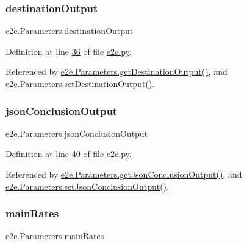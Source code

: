 \subsubsection{\texorpdfstring{destination\+Output}{destinationOutput}}
{\footnotesize\ttfamily e2e.\+Parameters.\+destination\+Output}



Definition at line \hyperlink{e2e_8py_source_l00036}{36} of file \hyperlink{e2e_8py_source}{e2e.\+py}.



Referenced by \hyperlink{e2e_8py_source_l00100}{e2e.\+Parameters.\+get\+Destination\+Output()}, and \hyperlink{e2e_8py_source_l00097}{e2e.\+Parameters.\+set\+Destination\+Output()}.

\mbox{\label{classe2e_1_1_parameters_a20ca05e6261a929f4a07b937ccce40af}} 
\subsubsection{\texorpdfstring{json\+Conclusion\+Output}{jsonConclusionOutput}}
{\footnotesize\ttfamily e2e.\+Parameters.\+json\+Conclusion\+Output}



Definition at line \hyperlink{e2e_8py_source_l00040}{40} of file \hyperlink{e2e_8py_source}{e2e.\+py}.



Referenced by \hyperlink{e2e_8py_source_l00121}{e2e.\+Parameters.\+get\+Json\+Conclusion\+Output()}, and \hyperlink{e2e_8py_source_l00124}{e2e.\+Parameters.\+set\+Json\+Conclusion\+Output()}.

\mbox{\label{classe2e_1_1_parameters_aaa2b41d7017ab4893bbe27fa8edb7180}} 
\subsubsection{\texorpdfstring{main\+Rates}{mainRates}}
{\footnotesize\ttfamily e2e.\+Parameters.\+main\+Rates}



